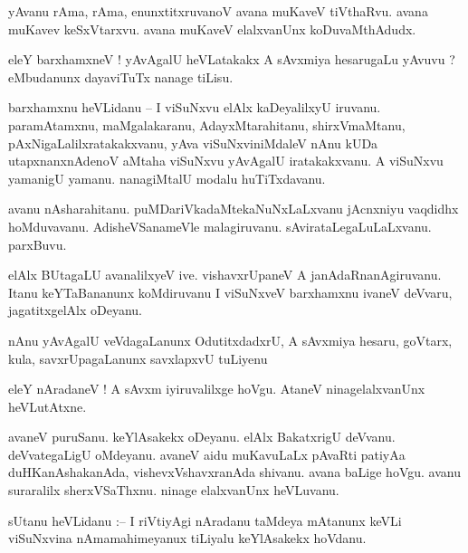\documentclass{article}
\begin{document}
\begin{mn}%
yAvanu rAma, rAma, enunxtitxruvanoV avana muKaveV tiVthaRvu. avana muKavev keSxVtarxvu. avana 
muKaveV elalxvanUnx koDuvaMthAdudx.
\end{mn}

\begin{mn}%
eleY barxhamxneV ! yAvAgalU heVLatakakx A sAvxmiya hesarugaLu yAvuvu ? eMbudanunx dayaviTuTx nanage 
tiLisu.
\end{mn}

\begin{mn}%
barxhamxnu heVLidanu -- I viSuNxvu elAlx kaDeyalilxyU iruvanu. paramAtamxnu, maMgalakaranu, 
AdayxMtarahitanu, shirxVmaMtanu, pAxNigaLalilxratakakxvanu, yAva viSuNxviniMdaleV nAnu kUDa 
utapxnanxnAdenoV aMtaha viSuNxvu yAvAgalU iratakakxvanu. A viSuNxvu yamanigU yamanu. nanagiMtalU 
modalu huTiTxdavanu.
\end{mn}

\begin{mn}%
avanu nAsharahitanu. puMDariVkadaMtekaNuNxLaLxvanu jAcnxniyu vaqdidhx hoMduvavanu. AdisheVSanameVle 
malagiruvanu. sAvirataLegaLuLaLxvanu. parxBuvu.
\end{mn}

\begin{mn}%
elAlx BUtagaLU avanalilxyeV ive. vishavxrUpaneV A janAdaRnanAgiruvanu. Itanu keYTaBananunx 
koMdiruvanu I viSuNxveV barxhamxnu ivaneV deVvaru, jagatitxgelAlx oDeyanu.
\end{mn}

\begin{mn}%
nAnu yAvAgalU veVdagaLanunx OdutitxdadxrU, A sAvxmiya hesaru, goVtarx, kula, savxrUpagaLanunx 
savxlapxvU tuLiyenu
\end{mn}

\begin{mn}%
eleY nAradaneV ! A sAvxm iyiruvalilxge hoVgu. AtaneV ninagelalxvanUnx heVLutAtxne.
\end{mn}

\begin{mn}%
avaneV puruSanu. keYlAsakekx oDeyanu. elAlx BakatxrigU deVvanu. deVvategaLigU oMdeyanu. avaneV aidu 
muKavuLaLx pAvaRti patiyAa duHKanAshakanAda, vishevxVshavxranAda shivanu. avana baLige hoVgu. avanu 
suraralilx sherxVSaThxnu. ninage elalxvanUnx heVLuvanu.
\end{mn}

\begin{mn}%
sUtanu heVLidanu :-- I riVtiyAgi nAradanu taMdeya mAtanunx keVLi viSuNxvina nAmamahimeyanux 
tiLiyalu keYlAsakekx hoVdanu.
\end{mn}
\end{document}
